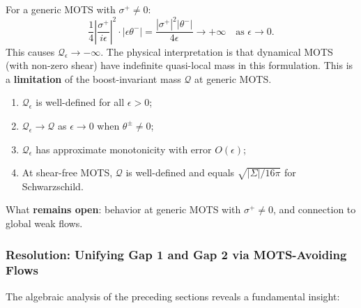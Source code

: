 \begin{remark}
For a generic MOTS with $\sigma^+ \neq 0$:
\begin{equation}
\frac{1}{4}\left|\frac{\sigma^+}{i\epsilon}\right|^2 \cdot |\epsilon\theta^-| = \frac{|\sigma^+|^2 |\theta^-|}{4\epsilon} \to +\infty \quad \text{as } \epsilon \to 0.
\end{equation}
This causes $\mathcal{Q}_\epsilon \to -\infty$. The physical interpretation is that dynamical MOTS (with non-zero shear) have indefinite quasi-local mass in this formulation. This is a \textbf{limitation} of the boost-invariant mass $\mathcal{Q}$ at generic MOTS.
\end{remark}

\begin{remark}
\begin{enumerate}
\item $\mathcal{Q}_\epsilon$ is well-defined for all $\epsilon > 0$;
\item $\mathcal{Q}_\epsilon \to \mathcal{Q}$ as $\epsilon \to 0$ when $\theta^\pm \neq 0$;
\item $\mathcal{Q}_\epsilon$ has approximate monotonicity with error $O(\epsilon)$;
\item At shear-free MOTS, $\mathcal{Q}$ is well-defined and equals $\sqrt{|\Sigma|/16\pi}$ for Schwarzschild.
\end{enumerate}
What \textbf{remains open}: behavior at generic MOTS with $\sigma^+ \neq 0$, and connection to global weak flows.
\end{remark}

\subsubsection{Resolution: Unifying Gap 1 and Gap 2 via MOTS-Avoiding Flows}

The algebraic analysis of the preceding sections reveals a fundamental insight:

